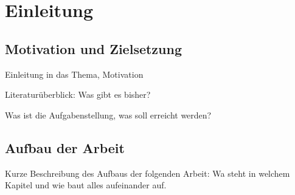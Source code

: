 

\chapter{Einleitung}
\label{einleitung}


\section{Motivation und Zielsetzung}

Einleitung in das Thema, Motivation

Literaturüberblick: Was gibt es bisher? 

Was ist die Aufgabenstellung, was soll erreicht werden?





\section{Aufbau der Arbeit}
Kurze Beschreibung des Aufbaus der folgenden Arbeit: Wa steht in welchem Kapitel
und wie baut alles aufeinander auf.


